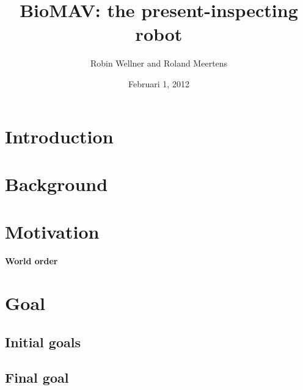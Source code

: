 \documentclass[a4paper,10pt]{article}
\begin{document}
\title{BioMAV: the present-inspecting robot}

\author{Robin Wellner and Roland Meertens}

\date{Februari 1, 2012}

\maketitle


\section{Introduction}

\section{Background}


\section{Motivation}
\textbf{World order}
\section{Goal}
\subsection{Initial goals}

\subsection{Final goal}
\end{document}
